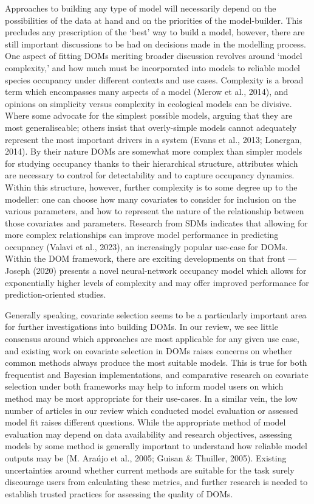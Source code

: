 \documentclass[
]{article}
\begin{document}
Approaches to building any type of model will necessarily depend on the
possibilities of the data at hand and on the priorities of the
model-builder. This precludes any prescription of the `best' way to
build a model, however, there are still important discussions to be had
on decisions made in the modelling process. One aspect of fitting DOMs
meriting broader discussion revolves around `model complexity,' and how
much must be incorporated into models to reliable model species
occupancy under different contexts and use cases. Complexity is a broad
term which encompasses many aspects of a model (Merow et al., 2014), and
opinions on simplicity versus complexity in ecological models can be
divisive. Where some advocate for the simplest possible models, arguing
that they are most generaliseable; others insist that overly-simple
models cannot adequately represent the most important drivers in a
system (Evans et al., 2013; Lonergan, 2014). By their nature DOMs are
somewhat more complex than simpler models for studying occupancy thanks
to their hierarchical structure, attributes which are necessary to
control for detectability and to capture occupancy dynamics. Within this
structure, however, further complexity is to some degree up to the
modeller: one can choose how many covariates to consider for inclusion
on the various parameters, and how to represent the nature of the
relationship between those covariates and parameters. Research from SDMs
indicates that allowing for more complex relationships can improve model
performance in predicting occupancy (Valavi et al., 2023), an
increasingly popular use-case for DOMs. Within the DOM framework, there
are exciting developments on that front --- Joseph (2020) presents a
novel neural-network occupancy model which allows for exponentially
higher levels of complexity and may offer improved performance for
prediction-oriented studies.

Generally speaking, covariate selection seems to be a particularly
important area for further investigations into building DOMs. In our
review, we see little consensus around which approaches are most
applicable for any given use case, and existing work on covariate
selection in DOMs raises concerns on whether common methods always
produce the most suitable models. This is true for both frequentist and
Bayesian implementations, and comparative research on covariate
selection under both frameworks may help to inform model users on which
method may be most appropriate for their use-cases. In a similar vein,
the low number of articles in our review which conducted model
evaluation or assessed model fit raises different questions. While the
appropriate method of model evaluation may depend on data availability
and research objectives, assessing models by some method is generally
important to understand how reliable model outputs may be (M. Araújo et
al., 2005; Guisan \& Thuiller, 2005). Existing uncertainties around
whether current methods are suitable for the task surely discourage
users from calculating these metrics, and further research is needed to
establish trusted practices for assessing the quality of DOMs.
\end{document}

